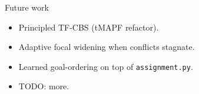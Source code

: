 \begin{frame}{Future work}
  \begin{itemize}
    \item Principled TF-CBS (tMAPF refactor).
    \item Adaptive focal widening when conflicts stagnate.
    \item Learned goal-ordering on top of \texttt{assignment.py}.
    \item TODO: more.
  \end{itemize}
\end{frame}
